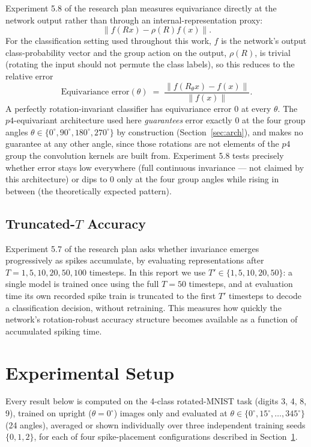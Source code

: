 \documentclass[11pt]{article}
\begin{document}
Experiment 5.8 of the research plan measures equivariance directly at the network output rather than
through an internal-representation proxy:
\[
\big\| f(Rx) - \rho(R) f(x) \big\|.
\]
For the classification setting used throughout this work, $f$ is the network's output
class-probability vector and the group action on the output, $\rho(R)$, is trivial (rotating the
input should not permute the class labels), so this reduces to the relative error
\begin{equation}
\text{Equivariance error}(\theta) \;=\; \frac{\big\| f(R_\theta x) - f(x) \big\|}{\big\| f(x) \big\|}. \label{eq:3}
\end{equation}
A perfectly rotation-invariant classifier has equivariance error 0 at every $\theta$. The
$p4$-equivariant architecture used here \emph{guarantees} error exactly 0 at the four group angles
$\theta \in \{0^\circ, 90^\circ, 180^\circ, 270^\circ\}$ by construction (Section~\ref{sec:arch}), and
makes no guarantee at any other angle, since those rotations are not elements of the $p4$ group the
convolution kernels are built from. Experiment 5.8 tests precisely whether error stays low everywhere
(full continuous invariance --- not claimed by this architecture) or dips to 0 only at the four group
angles while rising in between (the theoretically expected pattern).

\subsection{Truncated-$T$ Accuracy}

Experiment 5.7 of the research plan asks whether invariance emerges progressively as spikes
accumulate, by evaluating representations after $T = 1, 5, 10, 20, 50, 100$ timesteps. In this report
we use $T' \in \{1, 5, 10, 20, 50\}$: a single model is trained once using the full $T = 50$
timesteps, and at evaluation time its own recorded spike train is truncated to the first $T'$
timesteps to decode a classification decision, without retraining. This measures how quickly the
network's rotation-robust accuracy structure becomes available as a function of accumulated spiking
time.

\section{Experimental Setup}
\label{sec:setup}

\begin{keypoint}
Every result below is computed on the 4-class rotated-MNIST task (digits 3, 4, 8, 9), trained on
upright ($\theta = 0^\circ$) images only and evaluated at $\theta \in \{0^\circ, 15^\circ, \ldots,
345^\circ\}$ (24 angles), averaged or shown individually over three independent training seeds
$\{0, 1, 2\}$, for each of four spike-placement configurations described in Section~\ref{sec:setup}.
\end{keypoint}
\end{document}
